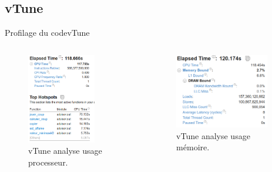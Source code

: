 \documentclass{beamer}
\begin{document}
\subsection{vTune}
\begin{frame}{Profilage du code}{vTune}
\begin{columns}
    \column{6.5cm}
    \begin{figure}
      \centering
   \includegraphics[width=0.75\textwidth]{vtune.png}
   \caption{vTune analyse usage processeur.\label{Fig:vTune_proc}}
    \end{figure}
    \column{6.5cm}
    \begin{figure}
      \centering
   \includegraphics[width=0.9\textwidth]{memory_vtune.png}
   \caption{vTune analyse usage mémoire.\label{Fig:vTune_mem}}
    \end{figure}
    
  \end{columns}
\end{frame}
\end{document}
